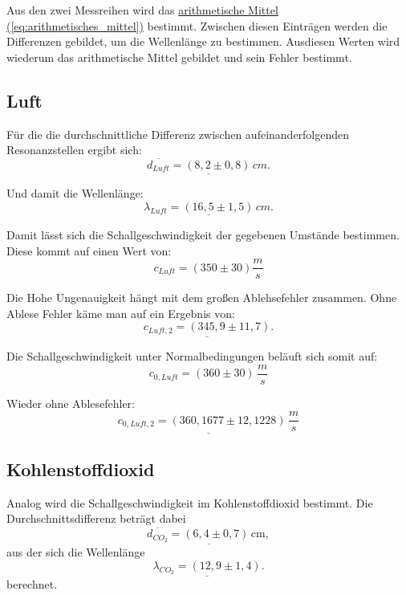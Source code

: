 Aus den zwei Messreihen wird das \hyperref[eq:arithmetisches_mittel]{arithmetische Mittel (\ref*{eq:arithmetisches_mittel})} bestimmt. Zwischen diesen Einträgen werden die Differenzen gebildet, um die Wellenlänge zu bestimmen. Ausdiesen Werten wird wiederum das arithmetische Mittel gebildet und sein Fehler bestimmt. 

\subsection{Luft}
Für die die durchschnittliche Differenz zwischen aufeinanderfolgenden Resonanzstellen ergibt sich:
\begin{equation}
    \underline{
        \overline{d_{Luft}} = (8,2 \pm 0,8)\,cm.
    }
\end{equation}

Und damit die Wellenlänge:
\begin{equation}
    \underline{
        {\lambda_{Luft}} = (16,5 \pm 1,5)\,cm.
    }
\end{equation}

Damit lässt sich die Schallgeschwindigkeit der gegebenen Umstände bestimmen. Diese kommt auf einen Wert von:
\begin{equation}
    \boxed{
        c_{Luft} = (350 \pm 30) \frac{m}{s}
    }
\end{equation}

Die Hohe Ungenauigkeit hängt mit dem großen Ablehsefehler zusammen. Ohne Ablese Fehler käme man auf ein Ergebnis von:
\begin{equation}
\underline{c_{Luft,2} = (345,9 \pm 11,7)}.
\end{equation}

Die Schallgeschwindigkeit unter Normalbedingungen beläuft sich somit auf:
\begin{equation}
\boxed{
    c_{0,Luft} = (360 \pm 30) \, \frac{m}{s}
}
\end{equation}

Wieder ohne Ablesefehler:
\begin{equation}
\underline{
    c_{0,Luft,2} = (360,1677 \pm 12,1228) \, \frac{m}{s}
}
\end{equation}

\subsection{Kohlenstoffdioxid}
Analog wird die Schallgeschwindigkeit im Kohlenstoffdioxid bestimmt. Die Durchschnittsdifferenz beträgt dabei
\begin{equation}
    \underline{
        \overline{d_{CO_2}} = (6,4 \pm 0,7) \, \mathrm{cm},
    }
\end{equation}
aus der sich die Wellenlänge
\begin{equation}
    \underline{\lambda_{CO_2} = (12,9 \pm 1,4)}.
\end{equation}
berechnet.

